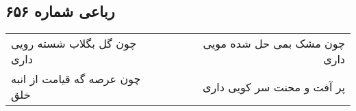 \begin{center}
\section*{رباعی شماره ۶۵۶}
\label{sec:sh656}
\begin{longtable}{l p{0.5cm} r}
چون گل بگلاب شسته رویی داری
&&
چون مشک بمی حل شده مویی داری
\\
چون عرصه گه قیامت از انبه خلق
&&
پر آفت و محنت سر کویی داری
\\
\end{longtable}
\end{center}
